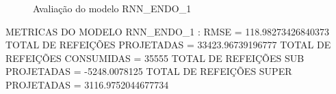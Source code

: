 \documentclass[	12pt, Times, openright, twoside, a4paper, english, brazil]{abntex2}
\begin{document}
                \begin{figure}[!ht]
                  \caption{Avaliação do modelo RNN\_ENDO\_1 \label{fig:case1_rnn_endo1_val} }
                \end{figure}
                METRICAS DO MODELO RNN\_ENDO\_1 : \newline
                RMSE = 118.98273426840373\newline
                TOTAL DE REFEIÇÕES PROJETADAS = 33423.96739196777\newline
                TOTAL DE REFEIÇÕES CONSUMIDAS = 35555\newline
                TOTAL DE REFEIÇÕES SUB PROJETADAS = -5248.0078125\newline
                TOTAL DE REFEIÇÕES SUPER PROJETADAS = 3116.9752044677734\newline

\end{document}
